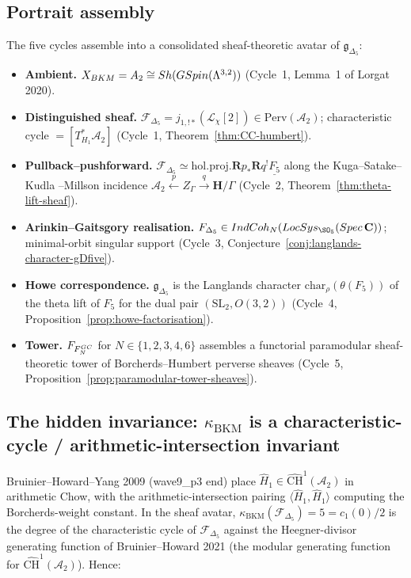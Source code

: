 \documentclass[11pt]{amsart}
\theoremstyle{definition}
\providecommand{\kBKM}{\kappa_{\mathrm{BKM}}}
\providecommand{\IndCoh}{\mathrm{IndCoh}}
\providecommand{\Perv}{\mathrm{Perv}}
\providecommand{\Sh}{\mathrm{Sh}}
\providecommand{\LocSys}{\mathrm{LocSys}}
\providecommand{\GSpin}{\mathrm{GSpin}}
\providecommand{\SL}{\mathrm{SL}}
\providecommand{\cL}{\mathcal{L}}
\providecommand{\cF}{\mathcal{F}}
\providecommand{\cCH}{\widehat{\mathrm{CH}}}
\providecommand{\bC}{\mathbf{C}}
\providecommand{\bR}{\mathbf{R}}
\providecommand{\bH}{\mathbf{H}}
\providecommand{\holproj}{\mathrm{hol.proj.}}
\providecommand{\Dfive}{\Delta_5}
\providecommand{\gDfive}{\mathfrak{g}_{\Dfive}}
\begin{document}
\subsection{Portrait assembly}

The five cycles assemble into a consolidated sheaf-theoretic avatar of
$\gDfive$:
\begin{itemize}\itemsep 2pt
 \item \textbf{Ambient.} $X_{\rm BKM} = \mathcal{A}_2 \cong
   \Sh(\GSpin(\Lambda^{3,2}))$ (Cycle~1, Lemma~1 of Lorgat 2020).
 \item \textbf{Distinguished sheaf.} $\cF_{\Dfive} =
   j_{1,!*}(\cL_\chi[2]) \in \Perv(\mathcal{A}_2)$; characteristic
   cycle $= [T^*_{H_1}\mathcal{A}_2]$ (Cycle~1,
   Theorem~\ref{thm:CC-humbert}).
 \item \textbf{Pullback--pushforward.} $\cF_{\Dfive} \simeq \holproj
   \bR p_* \bR q^! \underline{F_5}$ along the Kuga--Satake--Kudla
   --Millson incidence $\mathcal{A}_2 \xleftarrow{p} Z_\Gamma
   \xrightarrow{q} \bH/\Gamma$ (Cycle~2,
   Theorem~\ref{thm:theta-lift-sheaf}).
 \item \textbf{Arinkin--Gaitsgory realisation.} $\cF_{\Dfive} \in
   \IndCoh_{\cN}(\LocSys_{\SO_5}(\mathrm{Spec}\,\bC))$; minimal-orbit
   singular support (Cycle~3,
   Conjecture~\ref{conj:langlands-character-gDfive}).
 \item \textbf{Howe correspondence.} $\gDfive$ is the Langlands
   character $\mathrm{char}_\rho(\theta(F_5))$ of the theta lift of
   $F_5$ for the dual pair $(\SL_2, O(3,2))$ (Cycle~4,
   Proposition~\ref{prop:howe-factorisation}).
 \item \textbf{Tower.} $\cF_{F^{\rm GC}_N}$ for
   $N \in \{1, 2, 3, 4, 6\}$ assembles a functorial paramodular
   sheaf-theoretic tower of Borcherds--Humbert perverse sheaves
   (Cycle~5, Proposition~\ref{prop:paramodular-tower-sheaves}).
\end{itemize}

\subsection{The hidden invariance: $\kBKM$ is a
characteristic-cycle / arithmetic-intersection invariant}

Bruinier--Howard--Yang 2009 (wave9\_p3 end) place
$\hat{H}_1 \in \cCH^1(\mathcal{A}_2)$ in arithmetic Chow, with the
arithmetic-intersection pairing $\langle \hat{H}_1, \hat{H}_1 \rangle$
computing the Borcherds-weight constant. In the sheaf avatar,
$\kBKM(\cF_{\Dfive}) = 5 = c_1(0)/2$ is the degree of the
characteristic cycle of $\cF_{\Dfive}$ against the Heegner-divisor
generating function of Bruinier--Howard 2021 (the modular generating
function for $\cCH^1(\mathcal{A}_2)$). Hence:
\end{document}
